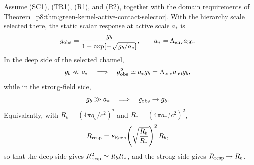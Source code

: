 \documentclass[12pt,a4paper]{article}
\begin{document}
\begin{theorem}
\label{p8:thm:hierarchy-selected-reeb-response}
Assume (SC1), (TR1), (R1), and (R2), together with the domain requirements of Theorem~\ref{p8:thm:green-kernel-active-contact-selector}.  With the hierarchy scale selected there, the static scalar response at active scale \(a_*\) is
\begin{equation}
\label{p8:eq:hierarchy-selected-reeb-response-law}
    g_{\rm obs}=
    \frac{g_b}{1-\exp[-\sqrt{g_b/a_*}]},
    \qquad
    a_* = \Lambda_{\rm env}a_{56}.
\end{equation}
In the deep side of the selected channel,
\begin{equation}
\label{p8:eq:selected-deep-response}
    g_b\ll a_*
    \quad\Longrightarrow\quad
    g_{\rm obs}^2\simeq a_*g_b
    =\Lambda_{\rm env}a_{56}g_b,
\end{equation}
while in the strong-field side,
\begin{equation}
\label{p8:eq:selected-newtonian-response}
    g_b\gg a_*
    \quad\Longrightarrow\quad
    g_{\rm obs}\to g_b.
\end{equation}
Equivalently, with \(R_b=(4\pi g_b/c^2)^2\) and \(R_*=(4\pi a_*/c^2)^2\),
\begin{equation}
\label{p8:eq:selected-curvature-response}
    R_{\rm resp}=\nu_{\rm Reeb}\!\left(\sqrt{\frac{R_b}{R_*}}\right)^2 R_b,
\end{equation}
so that the deep side gives \(R_{\rm resp}^2\simeq R_bR_*\), and the strong side gives \(R_{\rm resp}\to R_b\).
\end{theorem}
\end{document}
